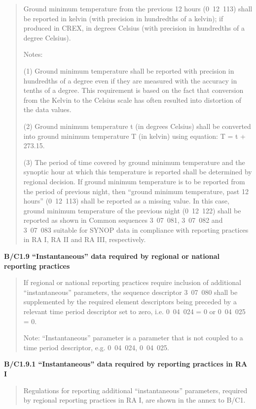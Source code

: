 \begin{quote}
Ground minimum temperature from the previous 12 hours (0~12~113) shall be reported in kelvin (with precision in hundredths of a kelvin); if produced in CREX, in degrees Celsius (with precision in hundredths of a degree Celsius).

Notes:

(1) Ground minimum temperature shall be reported with precision in hundredths of a degree even if they are measured with the accuracy in tenths of a degree. This requirement is based on the fact that conversion from the Kelvin to the Celsius scale has often resulted into distortion of the data values.

(2) Ground minimum temperature t (in degrees Celsius) shall be converted into ground minimum temperature T (in kelvin) using equation: T = t + 273.15.

(3) The period of time covered by ground minimum temperature and the synoptic hour at which this temperature is reported shall be determined by regional decision. If ground minimum temperature is to be reported from the period of previous night, then ``ground minimum temperature, past 12 hours'' (0~12~113) shall be reported as a missing value. In this case, ground minimum temperature of the previous night (0~12~122) shall be reported as shown in Common sequences 3~07~081, 3~07~082 and 3~07~083 suitable for SYNOP data in compliance with reporting practices in RA I, RA II and RA III, respectively.
\end{quote}

\textbf{B/C1.9 ``Instantaneous'' data required by regional or national reporting practices}

\begin{quote}
If regional or national reporting practices require inclusion of additional ``instantaneous'' parameters, the sequence descriptor 3~07~080 shall be supplemented by the required element descriptors being preceded by a relevant time period descriptor set to zero, i.e. 0~04~024 = 0 or 0~04~025 = 0.

Note: ``Instantaneous'' parameter is a parameter that is not coupled to a time period descriptor, e.g. 0~04~024, 0~04~025.
\end{quote}

\textbf{B/C1.9.1 ``Instantaneous'' data required by reporting practices in RA I}

\begin{quote}
Regulations for reporting additional ``instantaneous'' parameters, required by regional reporting practices in RA I, are shown in the annex to B/C1.
\end{quote}

